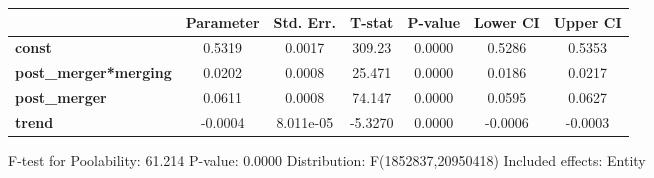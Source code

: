 \documentclass{report}a
\begin{document}
\begin{center}
\begin{tabular}{lcccccc}
                              & \textbf{Parameter} & \textbf{Std. Err.} & \textbf{T-stat} & \textbf{P-value} & \textbf{Lower CI} & \textbf{Upper CI}  \\
\midrule
\textbf{const}                &       0.5319       &       0.0017       &      309.23     &      0.0000      &       0.5286      &       0.5353       \\
\textbf{post\_merger*merging} &       0.0202       &       0.0008       &      25.471     &      0.0000      &       0.0186      &       0.0217       \\
\textbf{post\_merger}         &       0.0611       &       0.0008       &      74.147     &      0.0000      &       0.0595      &       0.0627       \\
\textbf{trend}                &      -0.0004       &     8.011e-05      &     -5.3270     &      0.0000      &      -0.0006      &      -0.0003       \\
\bottomrule
\end{tabular}
\end{center}

F-test for Poolability: 61.214 \newline
 P-value: 0.0000 \newline
 Distribution: F(1852837,20950418) \newline
  \newline
 Included effects: Entity
\end{document}
